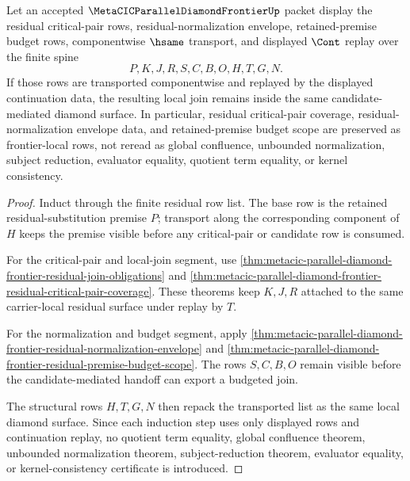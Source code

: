 \begin{theorem}
\label{thm:metacic-parallel-diamond-frontier-residual-join-transport-induction}
Let an accepted $\MetaCICParallelDiamondFrontierUp$ packet display the residual critical-pair rows, residual-normalization envelope, retained-premise budget rows, componentwise $\hsame$ transport, and displayed $\Cont$ replay over the finite spine
$$
P,K,J,R,S,C,B,O,H,T,G,N.
$$
If those rows are transported componentwise and replayed by the displayed continuation data, the resulting local join remains inside the same candidate-mediated diamond surface. In particular, residual critical-pair coverage, residual-normalization envelope data, and retained-premise budget scope are preserved as frontier-local rows, not reread as global confluence, unbounded normalization, subject reduction, evaluator equality, quotient term equality, or kernel consistency.
\end{theorem}
\begin{proof}
Induct through the finite residual row list. The base row is the retained residual-substitution premise $P$; transport along the corresponding component of $H$ keeps the premise visible before any critical-pair or candidate row is consumed.

For the critical-pair and local-join segment, use \autoref{thm:metacic-parallel-diamond-frontier-residual-join-obligations} and \autoref{thm:metacic-parallel-diamond-frontier-residual-critical-pair-coverage}. These theorems keep $K,J,R$ attached to the same carrier-local residual surface under replay by $T$.

For the normalization and budget segment, apply \autoref{thm:metacic-parallel-diamond-frontier-residual-normalization-envelope} and \autoref{thm:metacic-parallel-diamond-frontier-residual-premise-budget-scope}. The rows $S,C,B,O$ remain visible before the candidate-mediated handoff can export a budgeted join.

The structural rows $H,T,G,N$ then repack the transported list as the same local diamond surface. Since each induction step uses only displayed rows and continuation replay, no quotient term equality, global confluence theorem, unbounded normalization theorem, subject-reduction theorem, evaluator equality, or kernel-consistency certificate is introduced.
\end{proof}

